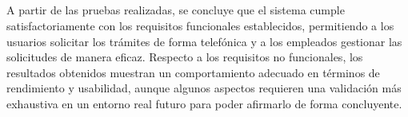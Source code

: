     \subsection*{}
        A partir de las pruebas realizadas, se concluye que el sistema cumple satisfactoriamente con los requisitos funcionales establecidos, permitiendo a los usuarios solicitar los trámites de forma telefónica y a los empleados gestionar las solicitudes de manera eficaz.
        Respecto a los requisitos no funcionales, los resultados obtenidos muestran un comportamiento adecuado en términos de rendimiento y usabilidad, aunque algunos aspectos requieren una validación más exhaustiva en un entorno real futuro para poder afirmarlo de forma concluyente.
